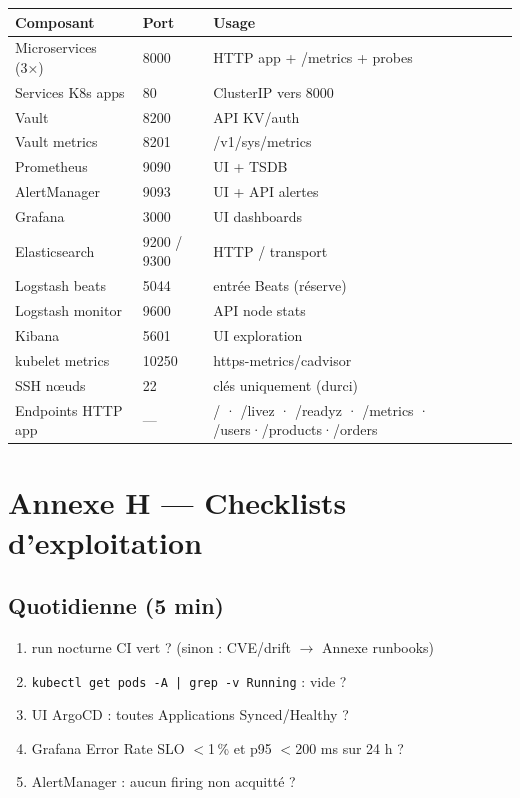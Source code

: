 \documentclass[12pt,a4paper]{article}
\begin{document}
\begin{longtable}{@{}p{4.6cm}p{2.2cm}p{7.2cm}@{}}
\toprule
\textbf{Composant} & \textbf{Port} & \textbf{Usage} \\
\midrule
\endhead
Microservices (3×) & 8000 & HTTP app + /metrics + probes \\
Services K8s apps & 80 & ClusterIP vers 8000 \\
Vault & 8200 & API KV/auth \\
Vault metrics & 8201 & /v1/sys/metrics \\
Prometheus & 9090 & UI + TSDB \\
AlertManager & 9093 & UI + API alertes \\
Grafana & 3000 & UI dashboards \\
Elasticsearch & 9200 / 9300 & HTTP / transport \\
Logstash beats & 5044 & entrée Beats (réserve) \\
Logstash monitor & 9600 & API node stats \\
Kibana & 5601 & UI exploration \\
kubelet metrics & 10250 & https-metrics/cadvisor \\
SSH nœuds & 22 & clés uniquement (durci) \\
Endpoints HTTP app & --- & / · /livez · /readyz · /metrics · /users·/products·/orders \\
\bottomrule
\end{longtable}

\section*{Annexe H --- Checklists d'exploitation}

\subsection*{Quotidienne (5 min)}
\begin{enumerate}[itemsep=1pt]
  \item run nocturne CI vert ? (sinon : CVE/drift $\rightarrow$ Annexe runbooks)
  \item \texttt{kubectl get pods -A | grep -v Running} : vide ?
  \item UI ArgoCD : toutes Applications Synced/Healthy ?
  \item Grafana Error Rate SLO $<$1\,\% et p95 $<$200 ms sur 24 h ?
  \item AlertManager : aucun firing non acquitté ?
\end{enumerate}
\end{document}
